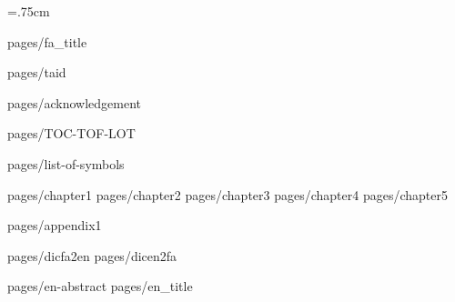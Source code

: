 \documentclass[
			   oneside,
			   phd,
			   12pt
			   ]{pages/AUTthesis}
\begin{document}
	\baselineskip=.75cm
	\linespread{1.75}

	 {pages/fa_title}
	
	 {pages/taid}
	
	 {pages/acknowledgement}
	
	
	 {pages/TOC-TOF-LOT}
	
	 {pages/list-of-symbols}
	
	\pagestyle{style1}
	
	 {pages/chapter1}
	 {pages/chapter2}
	 {pages/chapter3}
	 {pages/chapter4}
	 {pages/chapter5}
	

	\chapterfont{\vspace*{-2em}\centering\LARGE}%
	
	\appendix
	
	
	 {pages/appendix1}

	\parindent=0pt
	 {pages/dicfa2en}
	 {pages/dicen2fa}

	\pagestyle{style7}
	\printindex
	\pagestyle{style7}
	 {pages/en-abstract}
	 {pages/en_title}
	
\end{document}
